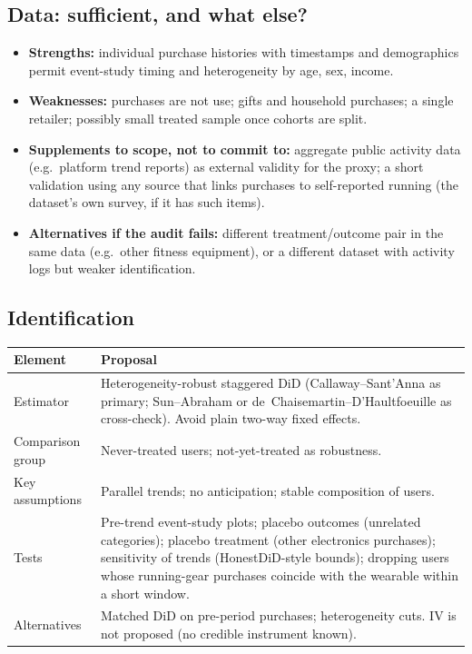 \documentclass[11pt]{article}
\begin{document}
\subsection*{Data: sufficient, and what else?}
\begin{itemize}
  \item \textbf{Strengths:} individual purchase histories with timestamps and demographics permit event-study
        timing and heterogeneity by age, sex, income.
  \item \textbf{Weaknesses:} purchases are not use; gifts and household purchases; a single retailer;
        possibly small treated sample once cohorts are split.
  \item \textbf{Supplements to scope, not to commit to:} aggregate public activity data (e.g.\ platform
        trend reports) as external validity for the proxy; a short validation using any source that links
        purchases to self-reported running (the dataset's own survey, if it has such items).
  \item \textbf{Alternatives if the audit fails:} different treatment/outcome pair in the same data
        (e.g.\ other fitness equipment), or a different dataset with activity logs but weaker identification.
\end{itemize}

\subsection*{Identification}
\begin{tabular}{p{}p{}}
\toprule
Element & Proposal \\
\midrule
Estimator & Heterogeneity-robust staggered DiD (Callaway--Sant'Anna as primary; Sun--Abraham or
            de~Chaisemartin--D'Haultfoeuille as cross-check). Avoid plain two-way fixed effects. \\
Comparison group & Never-treated users; not-yet-treated as robustness. \\
Key assumptions & Parallel trends; no anticipation; stable composition of users. \\
Tests & Pre-trend event-study plots; placebo outcomes (unrelated categories); placebo treatment
        (other electronics purchases); sensitivity of trends (HonestDiD-style bounds);
        dropping users whose running-gear purchases coincide with the wearable within a short window. \\
Alternatives & Matched DiD on pre-period purchases; heterogeneity cuts. IV is not proposed (no credible instrument known). \\
\bottomrule
\end{tabular}
\end{document}

